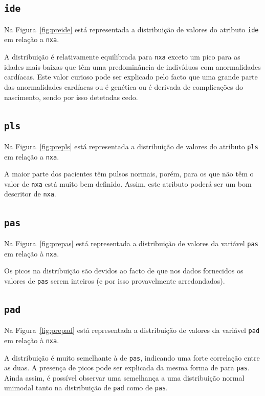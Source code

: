 \documentclass[10pt, conference, compsocconf]{IEEEtran}
\begin{document}
\subsection{\texttt{ide}}
Na Figura~\ref{fig:preide} está representada a distribuição de valores
do atributo {\tt ide} em relação a {\tt nxa}.


A distribuição é relativamente equilibrada para {\tt nxa} exceto um
pico para as idades mais baixas que têm uma predominância de
indivíduos com anormalidades cardíacas. Este valor curioso pode ser
explicado pelo facto que uma grande parte das anormalidades cardíacas
ou é genética ou é derivada de complicações do nascimento, sendo por
isso detetadas cedo.

\subsection{\texttt{pls}}
Na Figura~\ref{fig:prepls} está representada a distribuição de valores
do atributo {\tt pls} em relação a {\tt nxa}.


A maior parte dos pacientes têm pulsos normais, porém, para os que não
têm o valor de {\tt nxa} está muito bem definido. Assim, este atributo
poderá ser um bom descritor de {\tt nxa}.

\subsection{\texttt{pas}}
Na Figura~\ref{fig:prepas} está representada a distribuição de valores
da variável {\tt pas} em relação à {\tt nxa}.


Os picos na distribuição são devidos ao facto de que nos dados
fornecidos os valores de {\tt pas} serem inteiros (e por isso
provavelmente arredondados).

\subsection{\texttt{pad}}
Na Figura~\ref{fig:prepad} está representada a distribuição de valores
da variável {\tt pad} em relação à {\tt nxa}.


A distribuição é muito semelhante à de {\tt pas}, indicando uma forte
correlação entre as duas. A presença de picos pode ser explicada da
mesma forma de para {\tt pas}. Ainda assim, é possível observar uma
semelhança a uma distribuição normal unimodal tanto na distribuição de
{\tt pad} como de {\tt pas}.
\end{document}
